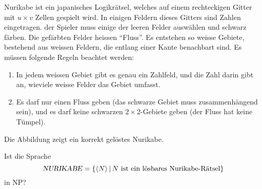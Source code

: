 Nurikabe ist ein japanisches Logikrätsel, welches auf einem rechteckigen
Gitter mit $u\times v$ Zellen gespielt wird. In einigen Feldern dieses Gitters
sind Zahlen eingetragen.
der Spieler muss einige der leeren Felder auswählen und schwarz
färben. Die gefärbten Felder heissen ``Fluss''. Es entstehen so
weisse Gebiete, bestehend aus weissen Feldern, die entlang einer Kante
benachbart sind. Es müssen folgende Regeln beachtet werden:
\begin{enumerate}
\item In jedem weissen Gebiet gibt es genau ein Zahlfeld, und die Zahl darin
gibt an, wieviele weisse Felder das Gebiet umfasst.
\item Es darf nur einen Fluss geben (das schwarze Gebiet muss zusammenhängend
sein), und es darf keine schwarzen $2\times 2$-Gebiete geben (der Fluss hat
keine Tümpel).
\end{enumerate}
Die Abbildung zeigt ein korrekt gelöstes Nurikabe.
\begin{center}
\end{center}
Ist die Sprache
\[
\text{\textsl{NURIKABE}}=\{\langle N\rangle\,|\,\text{$N$ ist ein lösbares Nurikabe-Rätsel}\}
\]
in NP?


